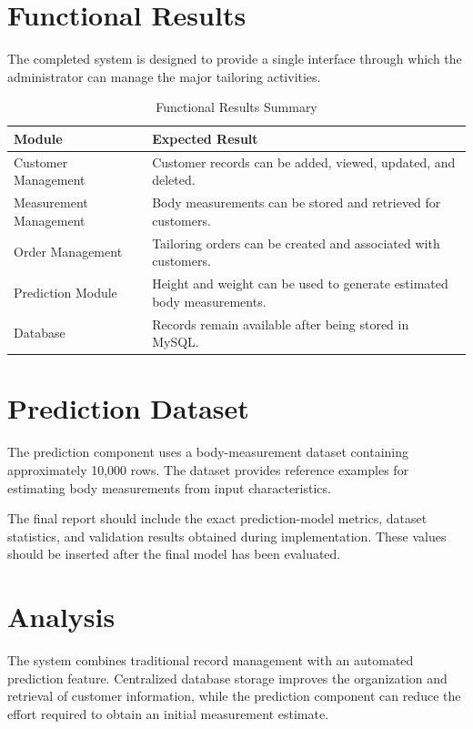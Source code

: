 \documentclass[12pt,a4paper]{report}
\begin{document}
\section{Functional Results}

The completed system is designed to provide a single interface through which
the administrator can manage the major tailoring activities.

\begin{table}[H]
\centering
\begin{tabular}{|p{4cm}|p{8cm}|}
  \hline
  \textbf{Module} & \textbf{Expected Result} \\
  \hline
  Customer Management & Customer records can be added, viewed, updated,
  and deleted. \\
  \hline
  Measurement Management & Body measurements can be stored and retrieved
  for customers. \\
  \hline
  Order Management & Tailoring orders can be created and associated with
  customers. \\
  \hline
  Prediction Module & Height and weight can be used to generate estimated
  body measurements. \\
  \hline
  Database & Records remain available after being stored in MySQL. \\
  \hline
\end{tabular}
\caption{Functional Results Summary}
\label{tab:functional-results}
\end{table}

\section{Prediction Dataset}

The prediction component uses a body-measurement dataset containing
approximately 10,000 rows. The dataset provides reference examples for
estimating body measurements from input characteristics.

The final report should include the exact prediction-model metrics, dataset
statistics, and validation results obtained during implementation. These
values should be inserted after the final model has been evaluated.

\section{Analysis}

The system combines traditional record management with an automated
prediction feature. Centralized database storage improves the organization
and retrieval of customer information, while the prediction component can
reduce the effort required to obtain an initial measurement estimate.
\end{document}
